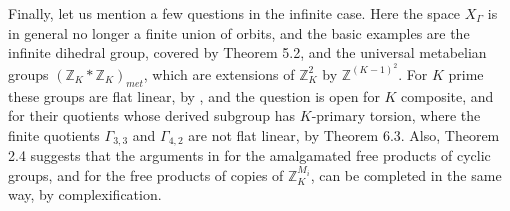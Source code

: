 \documentclass[12pt]{amsart}
\theoremstyle{definition}
\begin{document}
Finally, let us mention a few questions in the infinite case. Here the space $X_\Gamma$ is in general no longer a finite union of orbits, and the basic examples are the infinite dihedral group, covered by Theorem 5.2, and the universal metabelian groups $(\mathbb Z_K*\mathbb Z_K)_{met}$, which are extensions of $\mathbb Z_K^2$ by $\mathbb Z^{(K-1)^2}$. For $K$ prime these groups are flat linear, by \cite{bc2}, and the question is open for $K$ composite, and for their quotients whose derived subgroup has $K$-primary torsion, where the finite quotients $\Gamma_{3,3}$ and $\Gamma_{4,2}$ are not flat linear, by Theorem 6.3. Also, Theorem 2.4 suggests that the arguments in \cite{bfr} for the amalgamated free products of cyclic groups, and for the free products of copies of $\mathbb Z_K^{M_i}$, can be completed in the same way, by complexification.
\end{document}

